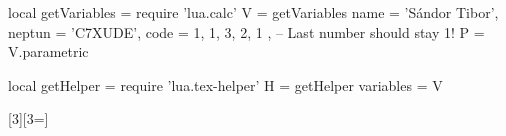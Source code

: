 \usepackage{luacode}

\begin{luacode}
  local getVariables = require 'lua.calc'
  V = getVariables {
      name = 'Sándor Tibor',
      neptun = 'C7XUDE',
      code = { 1, 1, 3, 2, 1 }, -- Last number should stay 1!
    }
  P = V.parametric

  local getHelper = require 'lua.tex-helper'
  H = getHelper {
      variables = V
    }
\end{luacode}

\usepackage{xargs}
\newcommand{\lv}[1]{\directlua{H.printVar [[#1]]}}
\newcommand{\lvec}[2]{\directlua{H.printVec { name="#1", index=#2 }}}
[3][3=]{}
\newcommand{\dv}[1]{\directlua{H.printDirect(#1)}}
